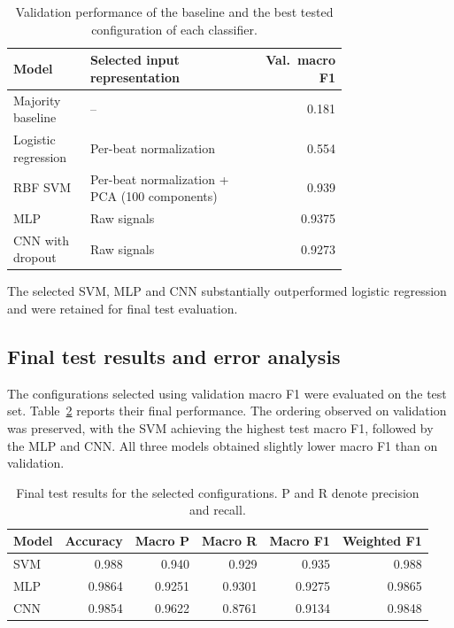 \documentclass[11pt,oneside,a4paper]{article}
\begin{document}
    \begin{table}[htbp]
        \centering
        \begin{tabular}{@{}p{0.23\linewidth}p{0.52\linewidth}r@{}}
            \toprule
            Model & Selected input representation & Val.\ macro F1 \\
            \midrule
            Majority baseline
                & --
                & 0.181 \\
            Logistic regression
                & Per-beat normalization
                & 0.554 \\
            RBF SVM
                & Per-beat normalization + PCA (100 components)
                & 0.939 \\
            MLP
                & Raw signals
                & 0.9375 \\
            CNN with dropout
                & Raw signals
                & 0.9273 \\
            \bottomrule
        \end{tabular}
        \caption{Validation performance of the baseline and the
        best tested configuration of each classifier.}
        \label{tab:validation_comparison}
    \end{table}
    The selected SVM, MLP and CNN substantially outperformed
    logistic regression and were retained for final test evaluation.
    \subsection{Final test results and error analysis}

    The configurations selected using validation macro F1 were
    evaluated on the test set. Table~\ref{tab:test_comparison}
    reports their final performance. The ordering observed on
    validation was preserved, with the SVM achieving the highest
    test macro F1, followed by the MLP and CNN. All three models
    obtained slightly lower macro F1 than on validation.

    \begin{table}[htbp]
        \centering
        \begin{tabular}{lrrrrr}
            \toprule
            Model & Accuracy & Macro P & Macro R
                & Macro F1 & Weighted F1 \\
            \midrule
            SVM & 0.988  & 0.940  & 0.929
                & 0.935  & 0.988 \\
            MLP & 0.9864 & 0.9251 & 0.9301
                & 0.9275 & 0.9865 \\
            CNN & 0.9854 & 0.9622 & 0.8761
                & 0.9134 & 0.9848 \\
            \bottomrule
        \end{tabular}
        \caption{Final test results for the selected configurations.
        P and R denote precision and recall.}
        \label{tab:test_comparison}
    \end{table}
\end{document}
